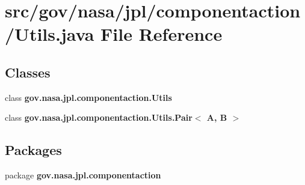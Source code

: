 \section{src/gov/nasa/jpl/componentaction/\+Utils.java File Reference}
\label{_utils_8java}
\subsection*{Classes}
\begin{DoxyCompactItemize}
\item 
class {\bf gov.\+nasa.\+jpl.\+componentaction.\+Utils}
\item 
class {\bf gov.\+nasa.\+jpl.\+componentaction.\+Utils.\+Pair$<$ A, B $>$}
\end{DoxyCompactItemize}
\subsection*{Packages}
\begin{DoxyCompactItemize}
\item 
package {\bf gov.\+nasa.\+jpl.\+componentaction}
\end{DoxyCompactItemize}
